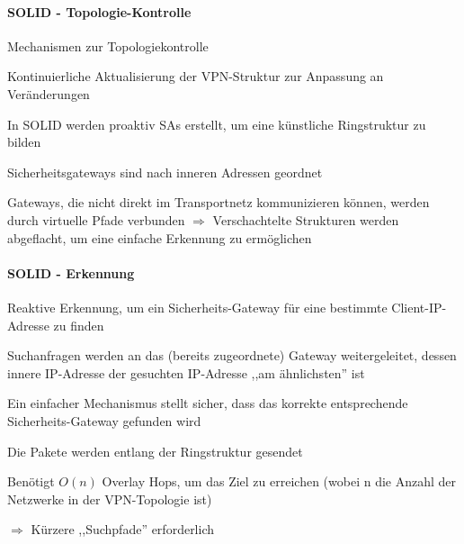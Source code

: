 \documentclass[a4paper]{article}
\begin{document}
\begin{multicols}{3}
\begin{itemize*}
            \paragraph{SOLID -
                  Topologie-Kontrolle}
            \begin{itemize*}
                  \item Mechanismen zur Topologiekontrolle
                  \begin{itemize*}
                        \item Kontinuierliche Aktualisierung der VPN-Struktur zur Anpassung an Veränderungen
                  \end{itemize*}
                  \item In SOLID werden proaktiv SAs erstellt, um eine künstliche Ringstruktur
                  zu bilden
                  \item Sicherheitsgateways sind nach inneren Adressen geordnet
                  \item Gateways, die nicht direkt im Transportnetz kommunizieren können,
                  werden durch virtuelle Pfade verbunden $\Rightarrow$
                  Verschachtelte Strukturen werden abgeflacht, um eine einfache
                  Erkennung zu ermöglichen
            \end{itemize*}

            \paragraph{SOLID - Erkennung}
            \begin{itemize*}
                  \item Reaktive Erkennung, um ein Sicherheits-Gateway für eine bestimmte
                  Client-IP-Adresse zu finden
                  \item Suchanfragen werden an das (bereits zugeordnete) Gateway
                  weitergeleitet, dessen innere IP-Adresse der gesuchten IP-Adresse ,,am
                  ähnlichsten'' ist
                  \begin{itemize*}
                        \item Ein einfacher Mechanismus stellt sicher, dass das korrekte entsprechende Sicherheits-Gateway gefunden wird
                        \item Die Pakete werden entlang der Ringstruktur gesendet
                        \item Benötigt $O(n)$ Overlay Hops, um das Ziel zu erreichen (wobei n die Anzahl der Netzwerke in der VPN-Topologie ist)
                  \end{itemize*}
                  \item $\Rightarrow$ Kürzere ,,Suchpfade'' erforderlich
            \end{itemize*}


\end{itemize*}
\end{multicols}
\end{document}

